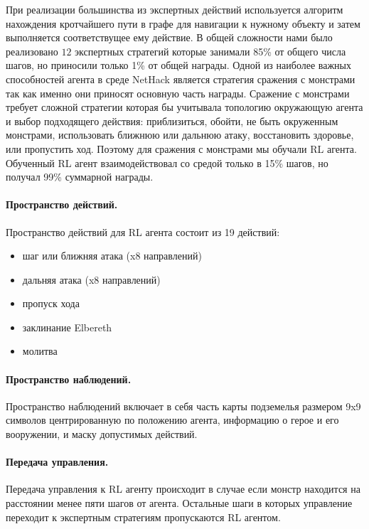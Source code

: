 При реализации большинства из экспертных действий используется алгоритм нахождения кротчайшего пути в графе для навигации к нужному объекту и затем выполняется соответствущее ему действие. В общей сложности нами было реализовано $12$ экспертных стратегий которые занимали 85\% от общего числа шагов, но приносили только 1\% от общей награды. Одной из наиболее важных способностей агента в среде NetHack является стратегия сражения с монстрами так как именно они приносят основную часть награды. Сражение с монстрами требует сложной стратегии которая бы учитывала топологию окружающую агента и выбор подходящего действия: приблизиться, обойти, не быть окруженным монстрами, использовать ближнюю или дальнюю атаку, восстановить здоровье, или пропустить ход. Поэтому для сражения с монстрами мы обучали RL агента. Обученный RL агент взаимодействовал со средой только в 15\% шагов, но получал 99\% суммарной награды. 

\paragraph{Пространство действий.} Пространство действий для RL агента состоит из 19 действий:
\begin{itemize}
    \item шаг или ближняя атака (x8 направлений)
    \item дальняя атака (x8 направлений)
    \item пропуск хода
    \item заклинание Elbereth
    \item молитва
\end{itemize}

\paragraph{Пространство наблюдений.} Пространство наблюдений включает в себя часть карты подземелья размером 9x9 символов центрированную по положению агента, информацию о герое и его вооружении, и маску допустимых действий. 

\paragraph{Передача управления.}
Передача управления к RL агенту происходит в случае если монстр находится на расстоянии менее пяти шагов от агента. Остальные шаги в которых управление переходит к экспертным стратегиям пропускаются RL агентом. 


